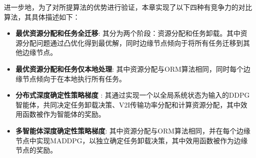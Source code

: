\begin{table}[h]\small
\centering
{}
\label{table 3-2}
\end{table}
 
进一步地，为了对所提算法的优势进行验证，本章实现了以下四种有竞争力的对比算法，其具体描述如下：
\begin{itemize}
	\item \textbf{最优资源分配和任务全迁移}: 其分为两个阶段：资源分配和任务卸载。其中资源分配问题通过凸优化得到最优解，同时边缘节点倾向于将所有任务迁移到其他边缘节点。
	\item \textbf{最优资源分配和任务仅本地处理}: 其中资源分配与ORM算法相同，同时每个边缘节点倾向于在本地执行所有任务。
	\item \textbf{分布式深度确定性策略梯度} \cite{barth2018distributed}: 其通过实现一个以全局系统状态为输入的DDPG智能体，共同决定任务卸载决策、V2I传输功率分配和计算资源分配，其中效用函数被作为智能体的奖励。
	\item \textbf{多智能体深度确定性策略梯度}\cite{zhang2021adaptive}: 其中资源分配与ORM算法相同，并在每个边缘节点中实现MADDPG，以独立确定任务卸载决策，其中效用函数被作为边缘节点的奖励。
\end{itemize}

